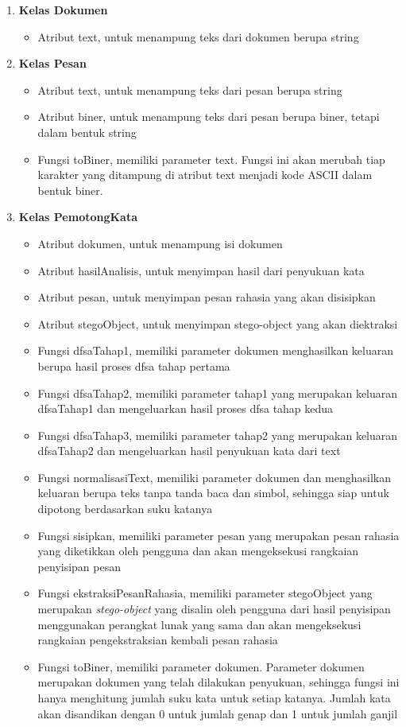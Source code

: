 \begin{enumerate}
	\item \textbf{Kelas Dokumen}
	\begin{itemize}
		\item Atribut text, untuk menampung teks dari dokumen berupa string
	\end{itemize}
	\item \textbf{Kelas Pesan}
	\begin{itemize}
		\item Atribut text, untuk menampung teks dari pesan berupa string
		\item Atribut biner, untuk menampung teks dari pesan berupa biner, tetapi dalam bentuk string
		\item Fungsi toBiner, memiliki parameter text. Fungsi ini akan merubah tiap karakter yang ditampung di atribut text menjadi kode ASCII dalam bentuk biner.
	\end{itemize}
	\item \textbf{Kelas PemotongKata}
	\begin{itemize}
		\item Atribut dokumen, untuk menampung isi dokumen
		\item Atribut hasilAnalisis, untuk menyimpan hasil dari penyukuan kata
		\item Atribut pesan, untuk menyimpan pesan rahasia yang akan disisipkan
		\item Atribut stegoObject, untuk menyimpan stego-object yang akan diektraksi
		\item Fungsi dfsaTahap1, memiliki parameter dokumen menghasilkan keluaran berupa hasil proses dfsa tahap pertama
		\item Fungsi dfsaTahap2, memiliki parameter tahap1 yang merupakan keluaran dfsaTahap1 dan mengeluarkan hasil proses dfsa tahap kedua
		\item Fungsi dfsaTahap3, memiliki parameter tahap2 yang merupakan keluaran dfsaTahap2 dan mengeluarkan hasil penyukuan kata dari text
		\item Fungsi normalisasiText, memiliki parameter dokumen dan menghasilkan keluaran berupa teks tanpa tanda baca dan simbol, sehingga siap untuk dipotong berdasarkan suku katanya
		\item Fungsi sisipkan, memiliki parameter pesan yang merupakan pesan rahasia yang diketikkan oleh pengguna dan akan mengeksekusi rangkaian penyisipan pesan
		\item Fungsi ekstraksiPesanRahasia, memiliki parameter stegoObject yang merupakan \textit{stego-object} yang disalin oleh pengguna dari hasil penyisipan menggunakan perangkat lunak yang sama dan akan mengeksekusi rangkaian pengekstraksian kembali pesan rahasia
		\item Fungsi toBiner, memiliki parameter dokumen. Parameter dokumen merupakan dokumen yang telah dilakukan penyukuan, sehingga fungsi ini hanya menghitung jumlah suku kata untuk setiap katanya. Jumlah kata akan disandikan dengan 0 untuk jumlah genap dan 1 untuk jumlah ganjil
	\end{itemize}
	
\end{enumerate}


